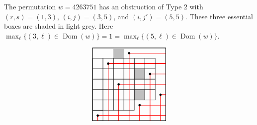 \documentclass[ALCO,Unicode,published]{cedram}
\DeclareMathOperator{\Dom}{Dom}
\begin{document}
\begin{example}
The permutation $w=4263751$ has an obstruction of Type $2$ with $(r,s) = (1,3)$, $(i,j) = (3,5)$, and $(i,j') = (5,5)$.  These three essential boxes are shaded in light grey.  Here $\max_\ell \{(3,\ell) \in \Dom(w)\} =1= \max_\ell \{(5,\ell) \in \Dom(w)\}$.  

\[
  \begin{tikzpicture}[x=1.5em,y=1.5em]
      \draw[color=black, thick](0,1)rectangle(7,8);
      \filldraw [color = lightgray] (2,7)rectangle(3,8);
      \filldraw [color = lightgray] (4,3)rectangle(5,4);
     \filldraw [color = lightgray] (4,5)rectangle(5,6);
     \draw[color=black](0,6)rectangle(1,7);
      \draw[color=black](1,6)rectangle(2,7);
      \draw[color=black](1,4)rectangle(2,5);
      \draw[color=black](3,4)rectangle(4,5);
       \draw[color=black](1,3)rectangle(2,4);
      \draw[color=black](3,3)rectangle(4,4);
      \draw[color=black](1,2)rectangle(2,3);  
       \draw[color=black](0,1)rectangle(1,2);  
      \draw[thick,color=red] (7,7.5)--(3.5,7.5)--(3.5,1);    
     \draw[thick,color=red] (7,6.5)--(1.5,6.5)--(1.5,1);
     \draw[thick,color=red] (7,5.5)--(5.5,5.5)--(5.5,1);
     \draw[thick,color=red] (7,4.5)--(2.5,4.5)--(2.5,1);
     \draw[thick,color=red] (7,3.5)--(6.5,3.5)--(6.5,1);
     \draw[thick,color=red] (7,2.5)--(4.5,2.5)--(4.5,1);
     \draw[thick,color=red] (7,1.5)--(0.5,1.5)--(0.5,1);
     \filldraw [black](0.5,1.5)circle(.1);
     \filldraw [black](2.5,4.5)circle(.1);
      \filldraw [black](4.5,2.5)circle(.1);
     \filldraw [black](5.5,5.5)circle(.1);
     \filldraw [black](3.5,7.5)circle(.1);
      \filldraw [black](1.5,6.5)circle(.1);
       \filldraw [black](6.5,3.5)circle(.1);
      \draw[color=black](2,6)rectangle(3,7);
      \draw[color=black](3,6)rectangle(4,7); 
      \draw[color=black](4,6)rectangle(5,7);
      \draw[color=black](5,6)rectangle(6,7); 
      \draw[color=black](0,5)rectangle(1,6);
      \draw[color=black](1,5)rectangle(2,6);  
      \draw[color=black](2,5)rectangle(3,6);
      \draw[color=black](3,5)rectangle(4,6); 
      \draw[color=black](4,5)rectangle(5,6);
      \draw[color=black](5,5)rectangle(6,6); 
      \draw[color=black](0,4)rectangle(1,5); 
      \draw[color=black](2,4)rectangle(3,5);
      \draw[color=black](4,4)rectangle(5,5);
      \draw[color=black](5,4)rectangle(6,5); 
      \draw[color=black](0,3)rectangle(1,4); 
      \draw[color=black](2,3)rectangle(3,4);
      \draw[color=black](4,3)rectangle(5,4);
      \draw[color=black](5,3)rectangle(6,4); 
      \draw[color=black](0,2)rectangle(1,3); 
      \draw[color=black](2,2)rectangle(3,3);
      \draw[color=black](3,2)rectangle(4,3);

\end{tikzpicture}\]
\end{example}
\end{document}
